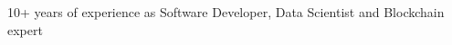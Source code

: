 

\begin{cvparagraph}

10+ years of experience as Software Developer, Data Scientist and Blockchain expert
\end{cvparagraph}
